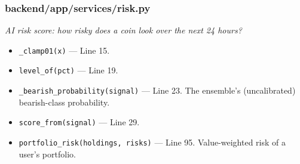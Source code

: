 \subsubsection*{backend/app/services/risk.py}
\textit{AI risk score: how risky does a coin look over the next 24 hours?}
\begin{itemize}[nosep,leftmargin=1.5em]
\item \texttt{\_\allowbreak{}clamp01(\allowbreak{}x)} --- Line 15.
\item \texttt{level\_\allowbreak{}of(\allowbreak{}pct)} --- Line 19.
\item \texttt{\_\allowbreak{}bearish\_\allowbreak{}probability(\allowbreak{}signal)} --- Line 23. The ensemble's (uncalibrated) bearish-class probability.
\item \texttt{score\_\allowbreak{}from(\allowbreak{}signal)} --- Line 29.
\item \texttt{portfolio\_\allowbreak{}risk(\allowbreak{}holdings,\allowbreak{} risks)} --- Line 95. Value-weighted risk of a user's portfolio.
\end{itemize}

